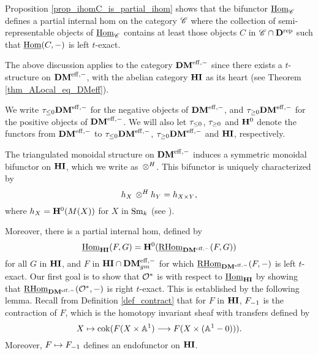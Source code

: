 Proposition \ref{prop_ihomC_is_partial_ihom} shows that the 
bifunctor $\underline{\mathrm{Hom}}_{\mathscr{C}}$ defines a partial internal hom on the
category $\mathscr{C}$ where the collection of semi-representable 
objects of $\underline{\mathrm{Hom}}_{\mathscr{C}}$ contains at least those objects $C$ 
in $\mathscr{C} \cap \mathbf{D}^{\mathrm{rep}}$ such that $\underline{\mathrm{Hom}}(C, -)$ is left 
$t$-exact.

The above discussion applies to the category $\mathbf{DM}^{\mathrm{eff},-}$ since
there exists a $t$-structure on $\mathbf{DM}^{\mathrm{eff},-}$, with the abelian 
category $\mathbf{HI}$ as its heart (see Theorem 
\ref{thm_ALocal_eq_DMeff}). 

\begin{defn}\label{def_t_struct_DMeff}
We write $\tau_{\leq 0}\mathbf{DM}^{\mathrm{eff},-}$ for the negative objects of $\mathbf{DM}^{\mathrm{eff},-}$, and 
$\tau_{\geq 0}\mathbf{DM}^{\mathrm{eff},-}$ for the positive objects of $\mathbf{DM}^{\mathrm{eff},-}$. We will 
also let $\tau_{\leq 0}$, $\tau_{\geq 0}$ and $\mathbf{H}^0$ denote the 
functors from $\mathbf{DM}^{\mathrm{eff},-}$ to $\tau_{\leq 0}\mathbf{DM}^{\mathrm{eff},-}$, $\tau_{\geq 0}\mathbf{DM}^{\mathrm{eff},-}$ 
and $\mathbf{HI}$, respectively. 
\end{defn}

The triangulated monoidal structure on $\mathbf{DM}^{\mathrm{eff},-}$ induces a 
symmetric monoidal bifunctor on $\mathbf{HI}$, which we write as $\,\otimes^H$. 
This bifunctor is uniquely characterized by
\[
h_{X} \,\otimes^H h_{Y} = h_{X \times Y},
\]
where $h_{X} = \mathbf{H}^0(M(X))$ for $X$ in $\mathrm{Sm}_{k}$ (see 
\cite[1.8]{DegModHom}).

Moreover, there is a partial internal hom, defined by
\[
\underline{\mathrm{Hom}}_{\mathbf{HI}}(F, G) = \mathbf{H}^0(\underline{\mathrm{RHom}}_{\mathbf{DM}^{\mathrm{eff},-}}(F, G))
\]
for all $G$ in $\mathbf{HI}$, and $F$ in $\mathbf{HI} \cap \mathbf{DM}^{\mathrm{eff},-}_{gm}$ for which 
$\underline{\mathrm{RHom}}_{\mathbf{DM}^{\mathrm{eff},-}}(F, -)$ is left $t$-exact. Our first goal is to show that 
$\mathcal{O}^*$ is \SemiInvertible with respect to $\underline{\mathrm{Hom}}_{\mathbf{HI}}$ by showing that
$\underline{\mathrm{RHom}}_{\mathbf{DM}^{\mathrm{eff},-}}(\mathcal{O}^*, -)$ is right $t$-exact. This is established by the 
following lemma. Recall from Definition \ref{def_contract} that 
for $F$ in $\mathbf{HI}$, $F_{-1}$ is the contraction of $F$, which is 
the homotopy invariant sheaf with transfers defined by
\[
X \mapsto \mathrm{cok}(F(X \times \mathbb{A}^1) \longrightarrow F(X \times 
(\mathbb{A}^1 - 0)) ).
\]
Moreover, $F \mapsto F_{-1}$ defines an endofunctor on $\mathbf{HI}$. 

